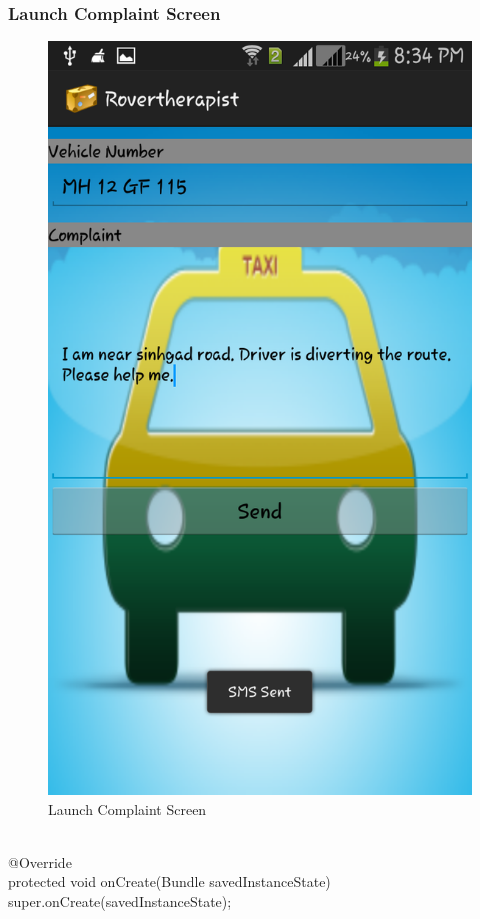 \documentclass[12pt,a4paper]{article}
\begin{document}
{\subsubsection{Launch Complaint Screen}
\begin{figure}[!htb]
\centering
\includegraphics[width=12 cm]{complaint}
\caption{Launch Complaint Screen}
\end{figure}
\\
\hspace{0.7 cm}@Override\\
	protected void onCreate(Bundle savedInstanceState) {\\
		super.onCreate(savedInstanceState);\\
}}
\end{document}
